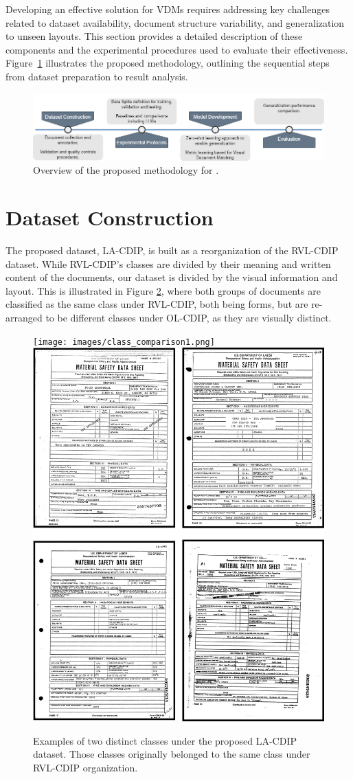 Developing an effective solution for \glspl{VDM} requires addressing key challenges related to dataset availability, document structure variability, and generalization to unseen layouts. This section provides a detailed description of these components and the experimental procedures used to evaluate their effectiveness. Figure~\ref{fig1} illustrates the proposed methodology, outlining the sequential steps from dataset preparation to result analysis.

\begin{figure}[htbp]
\centering
\includegraphics[width=\textwidth, trim={0em 0em 0em 0em},clip]{images/Pipeline Pesquisa 1.png}
\caption{Overview of the proposed  methodology for .\label{fig1}}
\end{figure}  

\section{Dataset Construction}
\label{sec:method_dataset}

The proposed dataset, \gls{LA-CDIP}, is built as a reorganization of the RVL-CDIP \cite{harley2015rvlcdip} dataset. While RVL-CDIP's classes are divided by their meaning and written content of the documents, our dataset is divided by the visual information and layout. This is illustrated in Figure \ref{img:dataset}, where both groups of documents are classified as the same class under RVL-CDIP, both being forms, but are re-arranged to be different classes under OL-CDIP, as they are visually distinct. 

\begin{figure}[htbp]
  \centering
\texttt{[image: images/class\_comparison1.png]} \hspace{.04\textwidth}
    \includegraphics[width=.455\textwidth]{images/class_comparison2.png}

\caption{Examples of two distinct classes under the proposed \gls{LA-CDIP} dataset. Those classes originally belonged to the same class under RVL-CDIP organization.\label{img:dataset}}
\end{figure}   

